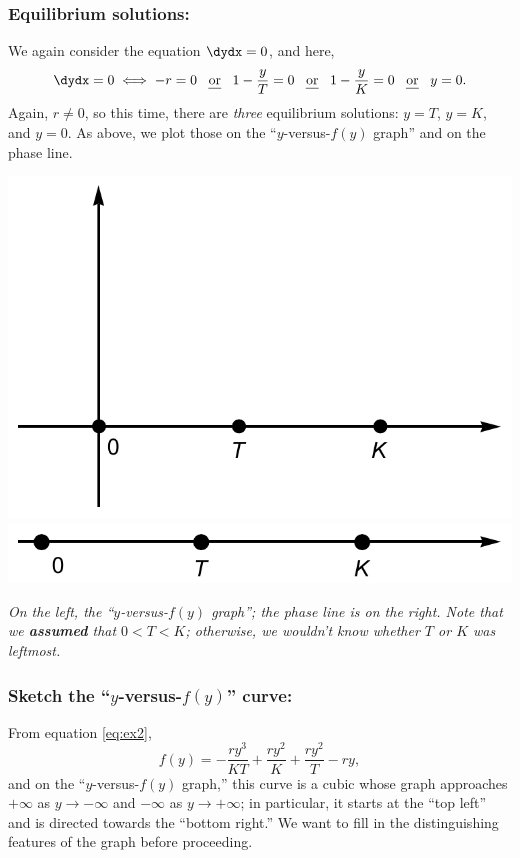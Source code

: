 \documentclass[12pt]{article}
\theoremstyle{definition}
\theoremstyle{underl}
\newcommand{\capt}[1]{\begin{adjustwidth}{0.5in}{0.5in}\centering\small\textit{#1}\end{adjustwidth}}
\begin{document}
	\subsubsection*{Equilibrium solutions:}\par
	We again consider the equation $\dydx=0$, and here,
	$$\dydx=0\iff-r=0\text{\hspace{3mm}\ul{or}\hspace{3mm}}1-\frac{y}{T}=0\text{\hspace{3mm}\ul{or}\hspace{3mm}}1-\frac{y}{K}=0\text{\hspace{3mm}\ul{or}\hspace{3mm}}y=0.$$
	Again, $r\neq 0$, so this time, there are \textit{three} equilibrium solutions: $y=T$, $y=K$, and $y=0$. As above, we plot those on the ``$y$-versus-$f(y)$ graph'' and on the phase line.
	\begin{center}
		\includegraphics[align=c,scale=0.675]{Ex2_yf(y)_1}
		\hspace{9mm}
		\includegraphics[align=c,scale=0.675]{Ex2_Phase_1}
		\vspace{1.5mm}
		\capt{On the left, the ``$y$-versus-$f(y)$ graph''; the phase line is on the right. Note that we \textbf{assumed} that $0<T<K$; otherwise, we wouldn't know whether $T$ or $K$ was leftmost.}
	\end{center}

	\subsubsection*{Sketch the ``$y$-versus-$f(y)$'' curve:}\par
	From equation \eqref{eq:ex2},
	$$f(y)=-\frac{r y^3}{K T}+\frac{r y^2}{K}+\frac{r y^2}{T}-r y,$$
	and on the ``$y$-versus-$f(y)$ graph,'' this curve is a cubic whose graph approaches $+\infty$ as $y\to-\infty$ and $-\infty$ as $y\to+\infty$; in particular, it starts at the ``top left'' and is directed towards the ``bottom right.'' We want to fill in the distinguishing features of the graph before proceeding.
	
\end{document}
